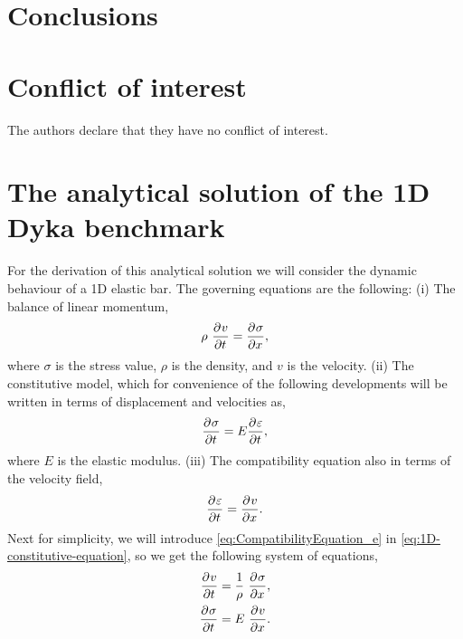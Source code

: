 \section{Conclusions}
\label{sec:conclusions}


%
\section*{Conflict of interest}
%
The authors declare that they have no conflict of interest.


\appendix
\section{The analytical solution of the 1D Dyka benchmark}
\label{app:analytical_sol}

For the derivation of this analytical solution we will consider  the
dynamic behaviour of a 1D elastic bar. The governing equations are the
following: (i) The balance of linear momentum,
\begin{equation}
  \label{eq:1D-balance-linear-momentum}
  \rho\ \frac{\partial^{}{v}}{ \partial {t}^{} } = \frac{\partial^{}{\sigma}}{ \partial {x}^{} },
\end{equation}
where $\sigma$ is the stress value, $\rho$ is the density, and 
$v$ is the velocity. (ii) The constitutive model, which for convenience of the
following developments will be written in terms of displacement and
velocities as, 
\begin{equation}
  \label{eq:1D-constitutive-equation}
  \frac{\partial^{}{\sigma}}{ \partial {t}^{} } = E \frac{\partial^{}{\varepsilon}}{ \partial {t}^{} },
\end{equation}
where $E$ is the elastic modulus. (iii) The compatibility equation
also in terms of the velocity field,
\begin{equation}
  \label{eq:CompatibilityEquation_e}
  \frac{\partial^{}{\varepsilon}}{ \partial {t}^{} } = \frac{\partial^{}{v}}{ \partial {x}^{} }.
\end{equation}
Next for simplicity, we will introduce \eqref{eq:CompatibilityEquation_e} in 
\eqref{eq:1D-constitutive-equation}, so we get the following system of equations,
\begin{align}
  \label{eq:1D-balance-linear-momentum-II}
  \frac{\partial^{}{v}}{ \partial {t}^{} } &= \frac{1}{\rho}\ \frac{\partial^{}{\sigma}}{ \partial {x}^{} }, \\
  \label{eq:1D-constitutive-equation-II}
  \frac{\partial^{}{\sigma}}{ \partial {t}^{} } &= E\ \frac{\partial^{}{v}}{ \partial {x}^{} }.
\end{align}

